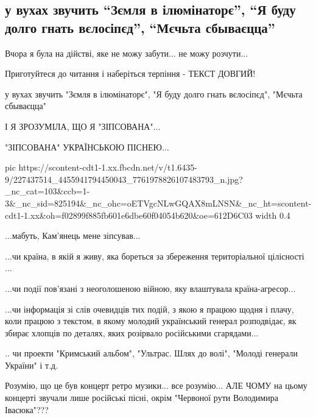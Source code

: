  
 
 
 
 
\subsection{у вухах звучить \enquote{Зємля в ілюмінаторє}, \enquote{Я буду долго гнать вєлосіпєд}, \enquote{Мєчьта сбываєцца} }

Вчора я була на дійстві, яке не можу забути... не можу розчути...  

Приготуйтеся до читання і наберіться терпіння - ТЕКСТ ДОВГИЙ!

у вухах звучить "Зємля в ілюмінаторє", "Я буду долго гнать вєлосіпєд", "Мєчьта сбываєцца" 

І Я ЗРОЗУМІЛА, ЩО Я "ЗІПСОВАНА"...

"ЗІПСОВАНА" УКРАЇНСЬКОЮ ПІСНЕЮ...

\ifcmt
  pic https://scontent-cdt1-1.xx.fbcdn.net/v/t1.6435-9/227437514_4455941794450043_7761978826107483793_n.jpg?_nc_cat=103&ccb=1-3&_nc_sid=825194&_nc_ohc=oETVgcNLwGQAX8mLNSN&_nc_ht=scontent-cdt1-1.xx&oh=f02899f885fb601e6dbe60f04054b620&oe=612D6C03
  width 0.4
\fi

...мабуть, Кам'янець мене зіпсував... 

...чи країна, в якій я живу, яка бореться за збереження територіальної
цілісності ... 

...чи події пов'язані з неоголошеною війною, яку влаштувала країна-агресор... 

...чи інформація зі слів очевидців тих подій, з якою я працюю щодня і плачу,
коли працюю з текстом, в якому молодий український  генерал розподвідає, як
збирає хлопців по деталях, яких розірвало російськими сгарядами... 

.. чи проекти "Кримський альбом", "Ультрас. Шлях до волі", "Молоді генерали
України" і т.д.

Розумію, що це був концерт ретро музики... все розумію... АЛЕ ЧОМУ на цьому
концерті звучали лише російські пісні, окрім "Червоної рути Володимира
Івасюка"???

